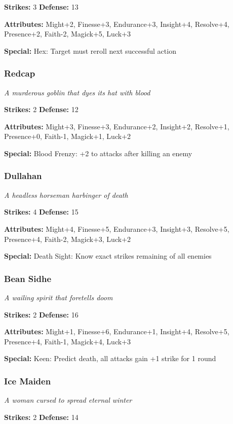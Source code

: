 \documentclass[10pt,twoside]{article}
\begin{document}
\textbf{Strikes:} 3 \quad \textbf{Defense:} 13

\textbf{Attributes:} Might+2, Finesse+3, Endurance+3, Insight+4, Resolve+4, Presence+2, Faith-2, Magick+5, Luck+3

\textbf{Special:} Hex: Target must reroll next successful action

\subsubsection{Redcap}
\textit{A murderous goblin that dyes its hat with blood}

\textbf{Strikes:} 2 \quad \textbf{Defense:} 12

\textbf{Attributes:} Might+3, Finesse+3, Endurance+2, Insight+2, Resolve+1, Presence+0, Faith-1, Magick+1, Luck+2

\textbf{Special:} Blood Frenzy: +2 to attacks after killing an enemy

\subsubsection{Dullahan}
\textit{A headless horseman harbinger of death}

\textbf{Strikes:} 4 \quad \textbf{Defense:} 15

\textbf{Attributes:} Might+4, Finesse+5, Endurance+3, Insight+3, Resolve+5, Presence+4, Faith-2, Magick+3, Luck+2

\textbf{Special:} Death Sight: Know exact strikes remaining of all enemies

\subsubsection{Bean Sidhe}
\textit{A wailing spirit that foretells doom}

\textbf{Strikes:} 2 \quad \textbf{Defense:} 16

\textbf{Attributes:} Might+1, Finesse+6, Endurance+1, Insight+4, Resolve+5, Presence+4, Faith-1, Magick+4, Luck+3

\textbf{Special:} Keen: Predict death, all attacks gain +1 strike for 1 round

\subsubsection{Ice Maiden}
\textit{A woman cursed to spread eternal winter}

\textbf{Strikes:} 2 \quad \textbf{Defense:} 14
\end{document}
